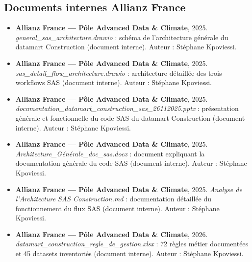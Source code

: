 \vspace{0.3cm}

\vspace{0.3cm}

\subsection*{Documents internes Allianz France}

\begin{itemize}[leftmargin=1.5cm]

    \item \textbf{Allianz France — Pôle Advanced Data \& Climate}, 2025. \textit{general\_sas\_architecture.drawio} : schéma de l’architecture générale du datamart Construction (document interne).  
    Auteur : Stéphane Kpoviessi.

    \item \textbf{Allianz France — Pôle Advanced Data \& Climate}, 2025. \textit{sas\_detail\_flow\_architecture.drawio} : architecture détaillée des trois workflows SAS (document interne).  
    Auteur : Stéphane Kpoviessi.

    \item \textbf{Allianz France — Pôle Advanced Data \& Climate}, 2025. \textit{documentation\_datamart\_construction\_sas\_26112025.pptx} : présentation générale et fonctionnelle du code SAS du datamart Construction (document interne).  
    Auteur : Stéphane Kpoviessi.

    \item \textbf{Allianz France — Pôle Advanced Data \& Climate}, 2025. \textit{Architecture\_Générale\_doc\_sas.docx} : document expliquant la documentation générale du code SAS (document interne).  
    Auteur : Stéphane Kpoviessi.

    \item \textbf{Allianz France — Pôle Advanced Data \& Climate}, 2025. \textit{Analyse de l'Architecture SAS Construction.md} : documentation détaillée du fonctionnement du flux SAS (document interne).  
    Auteur : Stéphane Kpoviessi.

    \item \textbf{Allianz France — Pôle Advanced Data \& Climate}, 2026. \textit{datamart\_construction\_regle\_de\_gestion.xlsx} : 72 règles métier documentées et 45 datasets inventoriés (document interne).  
    Auteur : Stéphane Kpoviessi.


\end{itemize}
